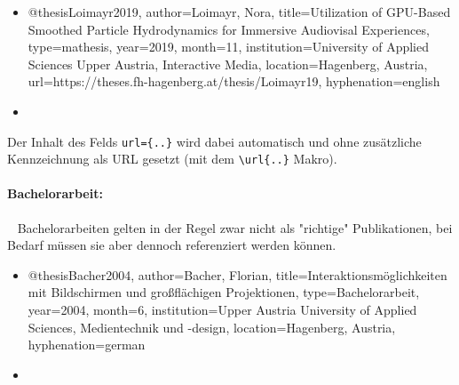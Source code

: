 %
\begin{itemize}
\item[]
\begin{GenericCode}[numbers=none]
@thesis{Loimayr2019,
  author={Loimayr, Nora},
  title={Utilization of GPU-Based Smoothed Particle Hydrodynamics for Immersive Audiovisal Experiences},
  type={mathesis},
  year={2019},
  month={11},
  institution={University of Applied Sciences Upper Austria, Interactive Media},
  location={Hagenberg, Austria},
  url={https://theses.fh-hagenberg.at/thesis/Loimayr19},
  hyphenation={english}
}
\end{GenericCode}
\item[\cite{Loimayr2019}] 
\end{itemize}
%
Der Inhalt des Felds \verb!url={..}! wird dabei automatisch und ohne zusätzliche
Kennzeichnung als URL gesetzt (mit dem \verb!\url{..}! Makro).


\paragraph{Bachelorarbeit:} ~ \newline
Bachelorarbeiten gelten in der Regel zwar nicht als "richtige" Publikationen, bei Bedarf müssen sie aber dennoch referenziert werden können. 
%
\begin{itemize}
\item[]
\begin{GenericCode}[numbers=none]
@thesis{Bacher2004,
  author={Bacher, Florian},
  title={Interaktionsmöglichkeiten mit Bildschirmen und großflächigen Projektionen},
  type={Bachelorarbeit},
  year={2004},
  month={6},
  institution={Upper Austria University of Applied Sciences, Medientechnik und {-design}},
  location={Hagenberg, Austria},
  hyphenation={german}
}
\end{GenericCode}
\item[\cite{Bacher2004}] 
\end{itemize}


